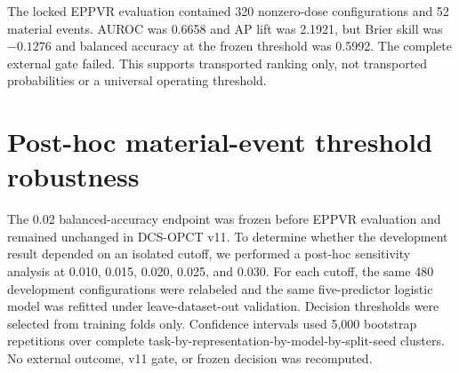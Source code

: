 \documentclass[preprint,12pt]{elsarticle}
\begin{document}
The locked EPPVR evaluation contained 320 nonzero-dose configurations and 52 material events. AUROC was 0.6658 and AP lift was 2.1921, but Brier skill was $-0.1276$ and balanced accuracy at the frozen threshold was 0.5992. The complete external gate failed. This supports transported ranking only, not transported probabilities or a universal operating threshold.

\section{Post-hoc material-event threshold robustness}

The 0.02 balanced-accuracy endpoint was frozen before EPPVR evaluation and remained unchanged in DCS-OPCT v11. To determine whether the development result depended on an isolated cutoff, we performed a post-hoc sensitivity analysis at 0.010, 0.015, 0.020, 0.025, and 0.030. For each cutoff, the same 480 development configurations were relabeled and the same five-predictor logistic model was refitted under leave-dataset-out validation. Decision thresholds were selected from training folds only. Confidence intervals used 5,000 bootstrap repetitions over complete task-by-representation-by-model-by-split-seed clusters. No external outcome, v11 gate, or frozen decision was recomputed.
\end{document}
